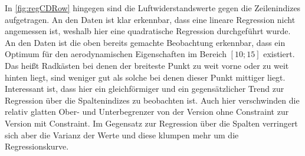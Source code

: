 In \cref{fig:regCDRow} hingegen sind die Luftwiderstandswerte gegen die Zeilenindizes aufgetragen.
An den Daten ist klar erkennbar, dass eine lineare Regression nicht angemessen ist, weshalb hier eine quadratische Regression durchgeführt wurde.
An den Daten ist die oben bereits gemachte Beobachtung erkennbar, dass ein Optimum für den aerodynamischen Eigenschaften im Bereich $[10;15]$ existiert.
Das heißt Radkästen bei denen der breiteste Punkt zu weit vorne oder zu weit hinten liegt, sind weniger gut als solche bei denen dieser Punkt mittiger liegt.
Interessant ist, dass hier ein gleichförmiger und ein gegensätzlicher Trend zur Regression über die Spaltenindizes zu beobachten ist.
Auch hier verschwinden die relativ glatten Ober- und Unterbegrenzer von der Version ohne Constraint zur Version mit Constraint.
Im Gegensatz zur Regression über die Spalten verringert sich aber die Varianz der Werte und diese klumpen mehr um die Regressionskurve.

